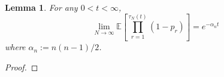\documentclass{article}
\newtheorem{lemma}{Lemma}
\newcommand{\E}{\mathbb{E}}
\newcommand{\1}[1]{\mathbbm{1}_{#1}}
\begin{document}
\begin{lemma}
For any $0 < t < \infty$,
\begin{equation}
\lim_{N\to\infty} \E\left[ \prod_{r=1}^{\tau_N(t)} (1-p_r) \right] = e^{-\alpha_n t}
\end{equation}
where $\alpha_n := n(n-1)/2$.
\end{lemma}
\begin{proof}

\end{proof}
\end{document}
